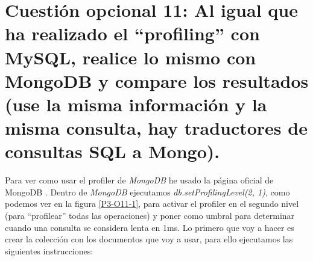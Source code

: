 \documentclass[a4paper,titlepage,12pt]{report}	%
\numberwithin{figure}{section} %
\numberwithin{table}{section} %
\begin{document}
	\section[Cuestión opcional 11: Al igual que ha realizado el “profiling” con MySQL, realice lo mismo con MongoDB y compare los resultados (use la misma información y la misma consulta, hay traductores de consultas SQL a Mongo).]{Cuestión opcional 11: Al igual que ha realizado el “profiling” con MySQL, realice lo mismo con MongoDB y compare los resultados (use la misma información y la misma consulta, hay traductores de consultas SQL a Mongo).}

	Para ver como usar el profiler de \textit{MongoDB} he usado la página oficial de MongoDB \cite{mongodb_profiler}. Dentro de \textit{MongoDB} ejecutamos \textit{db.setProfilingLevel(2, 1)}, como podemos ver en la figura \ref{P3-O11-1}, para activar el profiler en el segundo nivel (para ``profilear'' todas las operaciones) y poner como umbral para determinar cuando una consulta se considera lenta en 1ms. Lo primero que voy a hacer es crear la colección con los documentos que voy a usar, para ello ejecutamos las siguientes instrucciones:
\end{document}
